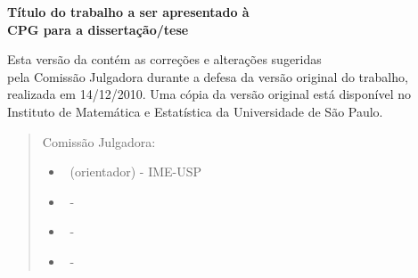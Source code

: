 %
%
%
%
\newpage
\thispagestyle{empty}
    \begin{center}
        \vspace*{2.3 cm}
        \textbf{\Large{Título do trabalho a ser apresentado à \\
        CPG para a dissertação/tese}}\\
        \vspace*{2 cm}
    \end{center}

    \vskip 2cm

    \begin{flushright}
	Esta versão da \MakeLowercase{\tipotrabalho} contém as correções e alterações sugeridas\\
	pela Comissão Julgadora durante a defesa da versão original do trabalho,\\
	realizada em 14/12/2010. Uma cópia da versão original está disponível no\\
	Instituto de Matemática e Estatística da Universidade de São Paulo.
    \end{flushright}
    \vskip 6.2cm

    \begin{quote}
    \noindent Comissão Julgadora:
    
    \begin{itemize}
		\item \proforientador~(orientador) - IME-USP %
		\item \profbancaa~- \profbancaafac %
		\item \profbancab~- \profbancabfac %
		\item \profbancac~- \profbancacfac %
    \end{itemize}
      
    \end{quote}
\pagebreak
